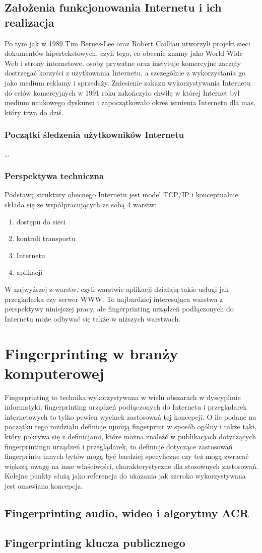 \subsection{Założenia funkcjonowania Internetu i ich realizacja}
Po tym jak w 1989 Tim Bernes-Lee oraz Robert Cailliau utworzyli projekt sieci
dokumentów hipertekstowych, czyli tego, co obecnie znamy jako World Wide Web i
strony internetowe, osoby prywatne oraz instytuje komercyjne zaczęły dostrzegać
korzyści z użytkowania Internetu, a szczególnie z wykorzystania go jako medium
reklamy i sprzedaży. Zniesienie zakazu wykorzystywania Internetu do celów
komercyjnych w 1991 roku zakończyło chwilę w której Internet był medium
naukowego dyskursu i zapoczątkowało okres istnienia Internetu dla mas, który
trwa do dziś.

\subsubsection{Początki śledzenia użytkowników Internetu}
\dots

\subsubsection{Perspektywa techniczna}
Podstawą struktury obecnego Internetu jest model TCP/IP i konceptualnie składa
się ze współpracujących ze sobą 4 warstw:
\begin{enumerate}
	\item dostępu do sieci
	\item kontroli transportu
	\item Internetu
	\item aplikacji
\end{enumerate}
W najwyższej z warstw, czyli warstwie aplikacji działają takie usługi jak
przeglądarka czy serwer WWW. To najbardziej interesująca warstwa z perspektywy
niniejszej pracy, ale fingerprinting urządzeń podłączonych do Internetu może
odbywać się także w niższych warstwach. %

\section{Fingerprinting w branży komputerowej}
Fingerprinting to technika wykorzystywana w wielu obszarach w dyscyplinie
informatyki; fingerprinting urządzeń podłączonych do Internetu i przeglądarek
internetowych to tylko pewien wycinek zastosowań tej koncepcji. O ile podane na
początku tego rozdziału definicje ujmują fingerprint w sposób ogólny i także
taki, który pokrywa się z definicjami, które można znaleźć w publikacjach
dotyczących fingerprintingu urządzeń i przeglądarek, to definicje dotyczące
zastosowań fingerprintu innych bytów mogą być bardziej specyficzne czy też mogą
zwracać większą uwagę na inne właściwości, charakterystyczne dla stosownych
zastosowań. Kolejne punkty służą jako referencja do ukazania jak szeroko
wykorzystywana jest omawiana koncepcja.

\subsection{Fingerprinting audio, wideo i algorytmy ACR}

\subsection{Fingerprinting klucza publicznego}
